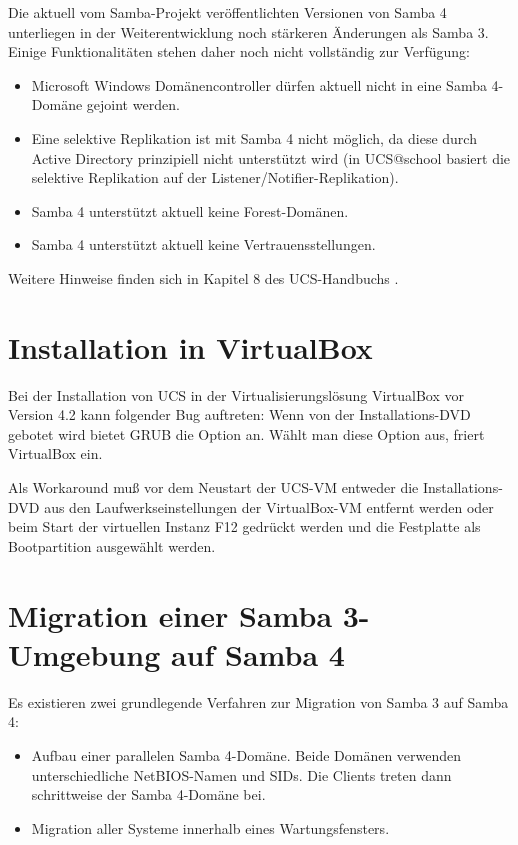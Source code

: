 Die aktuell vom Samba-Projekt veröffentlichten Versionen von Samba 4
unterliegen in der Weiterentwicklung noch stärkeren Änderungen als Samba
3. Einige Funktionalitäten stehen daher noch nicht vollständig zur Verfügung:

\begin{itemize}
\item Microsoft Windows Domänencontroller dürfen aktuell nicht in eine Samba 4-Domäne
gejoint werden.
\item Eine selektive Replikation ist mit Samba 4 nicht möglich, da diese durch
Active Directory prinzipiell nicht unterstützt wird (in UCS@school
basiert die selektive Replikation auf der Listener/Notifier-Replikation).
\item Samba 4 unterstützt aktuell keine Forest-Domänen. 
\item Samba 4 unterstützt aktuell keine Vertrauensstellungen.
\end{itemize}

Weitere Hinweise finden sich in Kapitel 8 des UCS-Handbuchs \cite{UCS-Handbuch}.

\section{Installation in VirtualBox}
Bei der Installation von UCS in der Virtualisierungslösung VirtualBox vor Version 4.2 kann folgender Bug auftreten:
Wenn von der Installations-DVD gebotet wird bietet
GRUB die Option  an. Wählt man diese Option aus, friert VirtualBox ein.

Als Workaround muß vor dem Neustart der UCS-VM entweder die
Installations-DVD aus den Laufwerkseinstellungen der VirtualBox-VM
entfernt werden oder beim Start der virtuellen Instanz F12 gedrückt
werden und die Festplatte als Bootpartition ausgewählt werden.

\section{Migration einer Samba 3-Umgebung auf Samba 4}
\label{samba-migration}

Es existieren zwei grundlegende Verfahren zur Migration von Samba 3 auf Samba
4:

\begin{itemize}
\item Aufbau einer parallelen Samba 4-Domäne. Beide Domänen verwenden
unterschiedliche NetBIOS-Namen und SIDs. Die Clients treten dann schrittweise
der Samba 4-Domäne bei.
\item Migration aller Systeme innerhalb eines Wartungsfensters.
\end{itemize}

